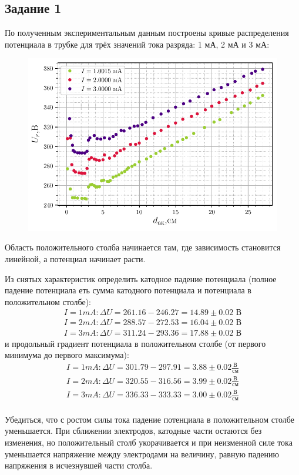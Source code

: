 \subsection{Задание 1}
По полученным экспериментальным данным построены кривые распределения потенциала в трубке для трёх значений тока 
разряда: 1 мА, 2 мА и 3 мА:
\begin{figure}[H]
	\centering
    \includegraphics[width=0.75\linewidth]{scripts/fig1}
	\caption{}
	\label{fig:5}
\end{figure}

Область положительного столба начинается там, где зависимость становится 
линейной, а потенциал начинает расти.

Из снятых характеристик определить катодное падение потенциала (полное 
падение потенциала еть сумма катодного потенциала и потенциала в 
положительном столбе):
\begin{gather*}
	I = 1 mA: \Delta U = 261.16-246.27=14.89 \pm 0.02  \text{ В}\\
	I = 2 mA: \Delta U = 288.57-272.53=16.04 \pm 0.02  \text{ В} \\
	I = 3 mA: \Delta U = 311.24-293.36=17.88 \pm 0.02 \text{ В}
\end{gather*}
и продольный градиент потенциала в положительном столбе (от первого 
минимума до первого максимума):
\begin{gather*}
    I = 1 mA: \Delta U = 301.79-297.91=3.88 \pm 0.02 \frac{\text{
    В}}{\text{см}}\\
	I = 2 mA: \Delta U = 320.55-316.56=3.99 \pm 0.02 \frac{\text{
    В}}{\text{см}}\\
	I = 3 mA: \Delta U = 336.33-333.33=3.00 \pm 0.02 \frac{\text{
    В}}{\text{см}}\\
\end{gather*}

Убедиться, что с ростом силы тока падение потенциала в положительном 
столбе уменьшается. При сближении электродов, катодные части остаются 
без изменения, но положительный столб укорачивается и при неизменной 
силе тока уменьшается напряжение между электродами на величину, равную 
падению напряжения в исчезнувшей части столба.


